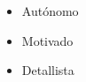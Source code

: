 %
%
%

\twocolumnsection
{
\begin{skills}
\end{skills}}
{
\vspace{1em}
\begin{itemize}
	\item Autónomo
	\item Motivado                    
    \item Detallista
\end{itemize}
}

